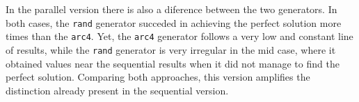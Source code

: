 In the parallel version there is also a diference between the two generators. In both cases, the \texttt{rand} generator succeded in achieving the perfect solution more times than the \texttt{arc4}. Yet, the \texttt{arc4} generator follows a very low and constant line of results, while the \texttt{rand} generator is very irregular in the mid case, where it obtained values near the sequential results when it did not manage to find the perfect solution. Comparing both approaches, this version amplifies the distinction already present in the sequential version.

\begin{figure}[!htp]
	\centering
	\captionsetup[subfloat]{position=top}
	\hfill


\end{figure}
